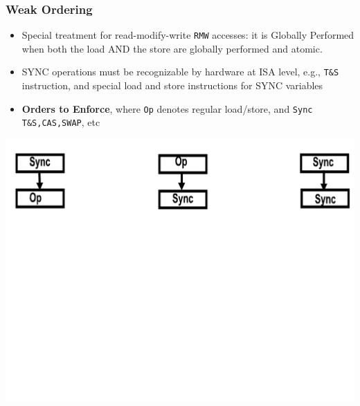\documentclass{beamer}
\newcommand{\emp}[1]{\textcolor{DikuRed}{ #1}}
\begin{document}
\begin{frame}[fragile,t]
\frametitle{Weak Ordering}

\begin{itemize}
    \item Special treatment for read-modify-write {\tt RMW} accesses:  
            it is Globally Performed when both the load \alert{AND} 
            the store are globally performed and atomic.\bigskip
        

    \item SYNC operations must be recognizable by hardware at ISA level, e.g., 
            {\tt T\&S} instruction, and special load and store instructions for
            SYNC variables\bigskip

    \item \emp{\bf Orders to Enforce}, where {\tt Op} denotes regular 
                load/store, and {\tt Sync}  {\tt T\&S,CAS,SWAP}, etc
\end{itemize}

\includegraphics[width=55ex]{Ch7Figs/WeakOrdering}

\end{frame}
\end{document}
